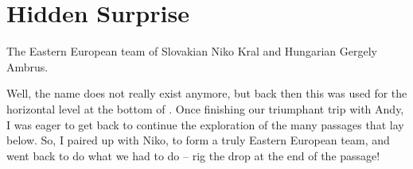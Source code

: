 \section{Hidden Surprise}


    \begin{marginfigure}
\checkoddpage \ifoddpage \forcerectofloat \else \forceversofloat \fi
\centering
 \caption{The Eastern European team of Slovakian Niko Kral and Hungarian Gergely Ambrus. }
 \label{eastern european}
\end{marginfigure}

Well, the name  does not really exist anymore, but back
then this was used for the horizontal level at the bottom of
. Once finishing our triumphant trip with Andy, I was
eager to get back to continue the exploration of the many passages that
lay below. So, I paired up with Niko, to form a truly Eastern European
team, and went back to do what we had to do -- rig the drop at the end
of the  passage!



